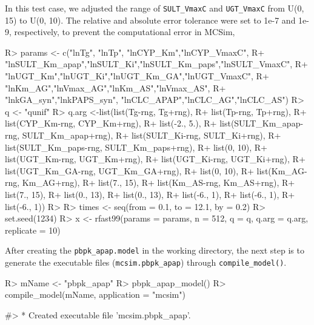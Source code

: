 \documentclass[article]{jss}
\begin{document}
In this test case, we adjusted the range of \texttt{SULT\_VmaxC} and
\texttt{UGT\_VmaxC} from U(0, 15) to U(0, 10). The relative and absolute
error tolerance were set to 1e-7 and 1e-9, respectively, to prevent the
computational error in MCSim,

\begin{CodeChunk}

\begin{CodeInput}
R> params <- c("lnTg", "lnTp", "lnCYP_Km","lnCYP_VmaxC",
R+            "lnSULT_Km_apap","lnSULT_Ki","lnSULT_Km_paps","lnSULT_VmaxC",
R+            "lnUGT_Km","lnUGT_Ki","lnUGT_Km_GA","lnUGT_VmaxC",
R+            "lnKm_AG","lnVmax_AG","lnKm_AS","lnVmax_AS",
R+            "lnkGA_syn","lnkPAPS_syn", "lnCLC_APAP","lnCLC_AG","lnCLC_AS")
R> q <- "qunif"
R> q.arg <-list(list(Tg-rng, Tg+rng),
R+              list(Tp-rng, Tp+rng),
R+              list(CYP_Km-rng, CYP_Km+rng),
R+              list(-2., 5.),
R+              list(SULT_Km_apap-rng, SULT_Km_apap+rng),
R+              list(SULT_Ki-rng, SULT_Ki+rng),
R+              list(SULT_Km_paps-rng, SULT_Km_paps+rng),
R+              list(0, 10),
R+              list(UGT_Km-rng, UGT_Km+rng),
R+              list(UGT_Ki-rng, UGT_Ki+rng),
R+              list(UGT_Km_GA-rng, UGT_Km_GA+rng),
R+              list(0, 10),
R+              list(Km_AG-rng, Km_AG+rng),
R+              list(7., 15),
R+              list(Km_AS-rng, Km_AS+rng),
R+              list(7., 15),
R+              list(0., 13),
R+              list(0., 13),
R+              list(-6., 1),
R+              list(-6., 1),
R+              list(-6., 1))
R> 
R> times <- seq(from = 0.1, to = 12.1, by = 0.2)
R> set.seed(1234)
R> x <- rfast99(params = params, n = 512, q = q, q.arg = q.arg, replicate = 10) 
\end{CodeInput}
\end{CodeChunk}

After creating the \texttt{pbpk\_apap.model} in the working directory,
the next step is to generate the executable files
(\texttt{mcsim.pbpk\_apap}) through \texttt{compile\_model()}.

\begin{CodeChunk}

\begin{CodeInput}
R> mName <- "pbpk_apap"
R> pbpk_apap_model()
R> compile_model(mName, application = "mcsim")
\end{CodeInput}

\begin{CodeOutput}
#> * Created executable file 'mcsim.pbpk_apap'.
\end{CodeOutput}
\end{CodeChunk}
\end{document}
